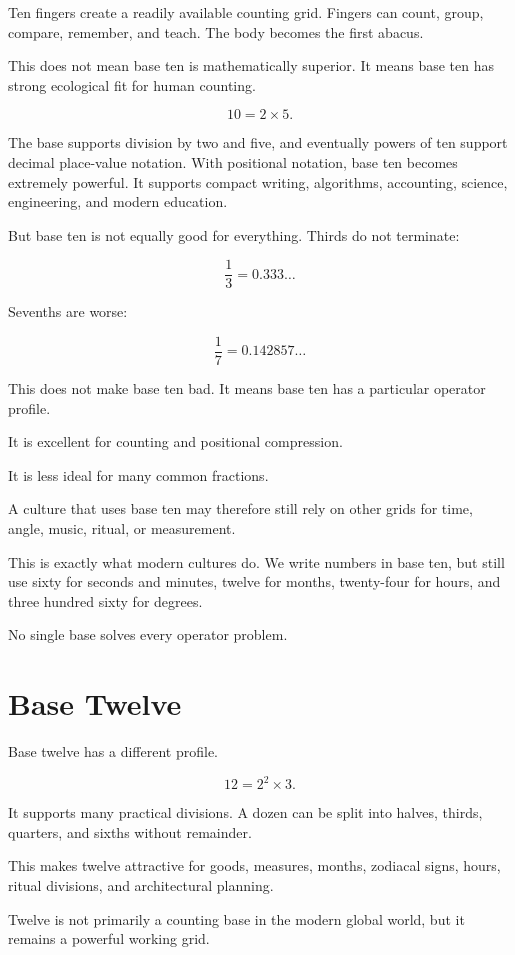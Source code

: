 \documentclass[11pt]{book}
\begin{document}
Ten fingers create a readily available counting grid. Fingers can count, group, compare, remember, and teach. The body becomes the first abacus.

This does not mean base ten is mathematically superior. It means base ten has strong ecological fit for human counting.

\[
10 = 2 \times 5.
\]

The base supports division by two and five, and eventually powers of ten support decimal place-value notation. With positional notation, base ten becomes extremely powerful. It supports compact writing, algorithms, accounting, science, engineering, and modern education.

But base ten is not equally good for everything. Thirds do not terminate:

\[
\frac{1}{3} = 0.333\ldots
\]

Sevenths are worse:

\[
\frac{1}{7} = 0.142857\ldots
\]

This does not make base ten bad. It means base ten has a particular operator profile.

It is excellent for counting and positional compression.

It is less ideal for many common fractions.

A culture that uses base ten may therefore still rely on other grids for time, angle, music, ritual, or measurement.

This is exactly what modern cultures do. We write numbers in base ten, but still use sixty for seconds and minutes, twelve for months, twenty-four for hours, and three hundred sixty for degrees.

No single base solves every operator problem.

\section{Base Twelve}

Base twelve has a different profile.

\[
12 = 2^2 \times 3.
\]

It supports many practical divisions. A dozen can be split into halves, thirds, quarters, and sixths without remainder.

This makes twelve attractive for goods, measures, months, zodiacal signs, hours, ritual divisions, and architectural planning.

Twelve is not primarily a counting base in the modern global world, but it remains a powerful working grid.
\end{document}
